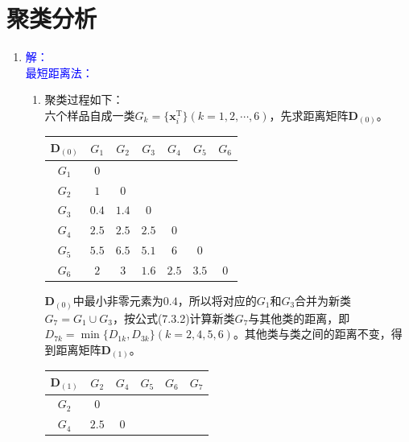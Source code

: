 \section{聚类分析}
    \begin{enumerate}
        \item
        {\kaishu \textcolor{blue}{解：}}\\
        {\kaishu \textcolor{blue}{最短距离法：}}
        \begin{enumerate}[label=(\arabic*)]
            \item 聚类过程如下：\\六个样品自成一类$G_k=\{\pmb{x}_i^{\mathrm{T}}\}(k=1,2,\cdots,6)$，先求距离矩阵$\pmb{D}_{(0)}$。
            \begin{table}[H]
                \centering
                \begin{tabular}{|c|c|c|c|c|c|c|}
                    \hline
                    $\pmb{D}_{(0)}$ & $G_1$ & $G_2$ & $G_3$ & $G_4$ & $G_5$ & $G_6$ \\ \hline
                    $G_1$ & $0$ & & & & & \\ \hline
                    $G_2$ & $1$ & $0$ & & & & \\ \hline
                    $G_3$ & $\textit{0.4}$ & $1.4$ & $0$ & & & \\ \hline
                    $G_4$ & $2.5$ & $2.5$ & $2.5$ & $0$ & & \\ \hline
                    $G_5$ & $5.5$ & $6.5$ & $5.1$ & $6$ & $0$ & \\ \hline
                    $G_6$ & $2$ & $3$ & $1.6$ & $2.5$ & $3.5$ & $0$ \\ \hline
                \end{tabular}
            \end{table}
            $\pmb{D}_{(0)}$中最小非零元素为$0.4$，所以将对应的$G_1$和$G_3$合并为新类$G_7=G_1 \cup G_3$，按公式(7.3.2)计算新类$G_7$与其他类的距离，即$D_{7k} = \min\{D_{1k},D_{3k}\}(k= 2,4,5,6)$。其他类与类之间的距离不变，得到距离矩阵$\pmb{D}_{(1)}$。
            \begin{table}[H]
                \centering
                \begin{tabular}{|c|c|c|c|c|c|}
                    \hline
                    $\pmb{D}_{(1)}$ & $G_2$ & $G_4$ & $G_5$ & $G_6$ & $G_7$ \\ \hline
                    $G_2$ & $0$ & & & & \\ \hline
                    $G_4$ & $2.5$ & $0$ & & & \\ \hline

\end{tabular}
\end{table}
\end{enumerate}
\end{enumerate}
